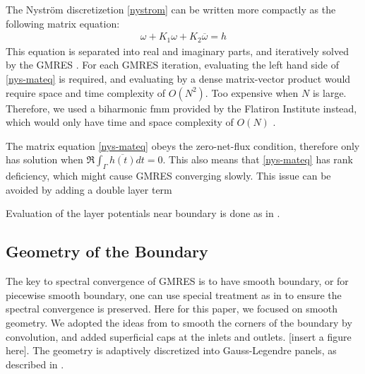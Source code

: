 \documentclass[10pt,twocolumn]{article}
\begin{document}
The Nystr\"om discretizetion \eqref{nystrom} can be written more compactly as the following matrix equation:
\begin{align}
    \omega + K_1\omega + K_2\overline{\omega} = h \label{nys-mateq}
\end{align}
This equation is separated into real and imaginary parts, and iteratively solved by the GMRES \cite{saadGMRESGeneralizedMinimal1986}. 
For each GMRES iteration, evaluating the left hand side of \eqref{nys-mateq} 
is required, and evaluating by a dense matrix-vector product would require space and time complexity of $O(N^2)$. Too expensive when $N$ is large. Therefore, we used a biharmonic fmm provided by the Flatiron Institute instead, which would only have time and space complexity of $O(N)$ \cite{FlatironinstituteFmm2d2022}. 

The matrix equation \eqref{nys-mateq} 
obeys the zero-net-flux condition, 
therefore only has solution when $\Re \int_\Gamma \overline{h(t)} dt = 0$. 
This also means that \eqref{nys-mateq} has rank deficiency, which might cause GMRES converging slowly. 
This issue can be avoided by adding a double layer term 



Evaluation of the layer potentials near boundary is done as in \cite{wuSolutionStokesFlow2020}. 

\subsection{Geometry of the Boundary}

The key to spectral convergence of GMRES is to have smooth boundary, 
or for piecewise smooth boundary, one can use special treatment as in \cite{wuSolutionStokesFlow2020}
to ensure the spectral convergence is preserved. Here for this paper, we focused on smooth geometry. 
We adopted the ideas from 
\cite{epsteinSmoothedCornersScattered2016,baggeHighlyAccurateSpecial2021} 
to smooth the corners of the boundary by convolution, and added superficial caps at the 
inlets and outlets. [insert a figure here]. The geometry is adaptively discretized into Gauss-Legendre panels, as described in
\cite{wuSolutionStokesFlow2020}. 
\end{document}
